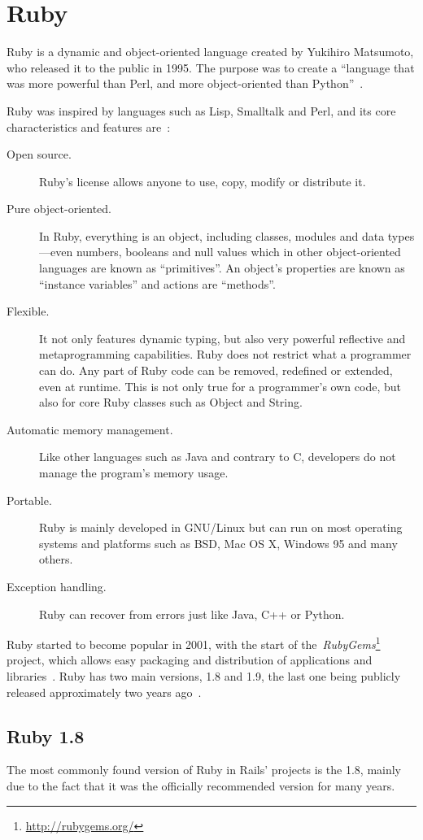 \section{Ruby} %
\label{tech:sec:ruby}
Ruby is a dynamic and object-oriented language created by Yukihiro Matsumoto, who released it to the public in 1995. The purpose was to create a ``language that was more powerful than Perl, and more object-oriented than Python''~\cite{interview_creator_ruby}.

Ruby was inspired by languages such as Lisp, Smalltalk and Perl, and its core characteristics and features are~\cite{ruby_about, ruby_book}:
\begin{description}
  \item[Open source.] Ruby's license allows anyone to use, copy, modify or distribute it.
  \item[Pure object-oriented.] In Ruby, everything is an object, including classes, modules and data types---even numbers, booleans and null values which in other object-oriented languages are known as ``primitives''. An object's properties are known as ``instance variables'' and actions are ``methods''.
  \item[Flexible.] It not only features dynamic typing, but also very powerful reflective and metaprogramming capabilities. Ruby does not restrict what a programmer can do. Any part of Ruby code can be removed, redefined or extended, even at runtime. This is not only true for a programmer's own code, but also for core Ruby classes such as Object and String.
  \item[Automatic memory management.] Like other languages such as Java and contrary to C, developers do not manage the program's memory usage.
  \item[Portable.] Ruby is mainly developed in GNU/Linux but can run on most operating systems and platforms such as BSD, Mac OS X, Windows 95 and many others.
  \item[Exception handling.] Ruby can recover from errors just like Java, C++ or Python.
\end{description}
Ruby started to become popular in 2001, with the start of the~\textit{RubyGems}\footnote{\url{http://rubygems.org/}} project, which allows easy packaging and distribution of applications and libraries~\cite{railssolutions}. Ruby has two main versions, 1.8 and 1.9, the last one being publicly released approximately two years ago~\cite{ruby191_release}.


\subsection{Ruby 1.8}
The most commonly found version of Ruby in Rails' projects is the 1.8, mainly due to the fact that it was the officially recommended version for many years.


